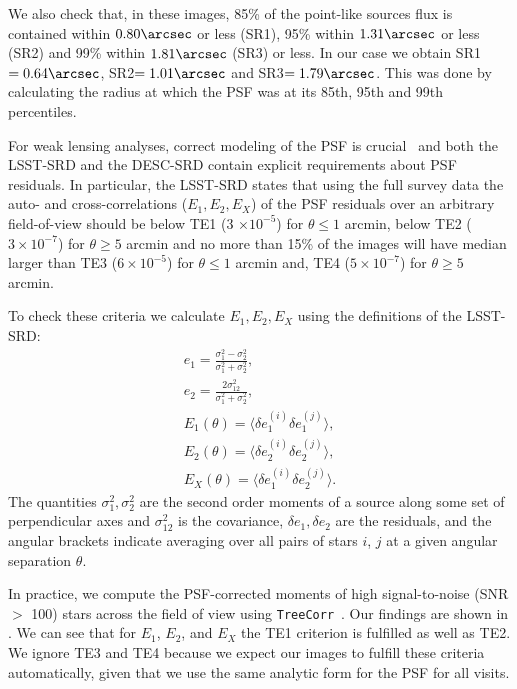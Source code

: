 \documentclass[\docopts]{\docclass}
\begin{document}
We also check that, in these images, 85\% of the point-like sources flux is contained within $0.80\arcsec$ or less (SR1), 95\% within $1.31\arcsec$ or less (SR2) and 99\% within $1.81\arcsec$ (SR3) or less. In our case we obtain SR1$=0.64\arcsec$, SR2$=1.01\arcsec$ and SR3$=1.79\arcsec$. This was done by calculating the radius at which the PSF was at its 85th, 95th and 99th percentiles.

For weak lensing analyses, correct modeling of the PSF is crucial~\citep{2004MNRAS.353..529H} and both the LSST-SRD and the DESC-SRD contain explicit requirements about PSF residuals. In particular, the LSST-SRD states that using the full survey data the auto- and cross-correlations ($E_{1}, E_{2}, E_{X}$) of the PSF residuals over an arbitrary field-of-view should be below TE1 (3 $\times 10^{-5}$) for $\theta \leq 1$ arcmin, below TE2 ($3 \times 10^{-7}$) for $\theta \geq 5$ arcmin and no more than 15\% of the images will have median larger than TE3 ($6 \times 10^{-5}$) for $\theta \leq 1$ arcmin and, TE4 ($5 \times 10^{-7}$) for $\theta \geq 5$ arcmin. 

To check these criteria we calculate $E_{1}, E_{2}, E_{X}$ using the definitions of the LSST-SRD:
\begin{eqnarray}
e_{1} = \frac{\sigma^{2}_{1} - \sigma^{2}_{2}}{\sigma_{1}^{2}+\sigma_{2}^{2}},\\
e_{2} = \frac{2\sigma^{2}_{12}}{\sigma_{1}^{2}+\sigma_{2}^{2}},\\
E_{1} (\theta) = \langle \delta e^{(i)}_{1}\delta e^{(j)}_{1} \rangle,\\
E_{2} (\theta) = \langle \delta e^{(i)}_{2}\delta e^{(j)}_{2} \rangle,\\
E_{X} (\theta) = \langle \delta e^{(i)}_{1}\delta e^{(j)}_{2} \rangle.
\end{eqnarray}
The quantities $\sigma_{1}^{2}, \sigma_{2}^{2}$ are the second order moments of a source along some set of perpendicular axes and $\sigma^{2}_{12}$ is the covariance, $\delta e_{1}, \delta e_{2}$ are the residuals, and the angular brackets indicate averaging over all pairs of stars $i$, $j$ at a given angular separation $\theta$.

In practice, we compute the PSF-corrected moments of high signal-to-noise (SNR $>$ 100) stars across the field of view using \texttt{TreeCorr}~\citep{2004MNRAS.352..338J}. Our findings are shown in . We can see that for $E_{1}$, $E_{2}$, and $E_{X}$ the TE1 criterion is fulfilled as well as TE2. We ignore TE3 and TE4 because we expect our images to fulfill these criteria automatically, given that we use the same analytic form for the PSF for all visits. 
\end{document}
